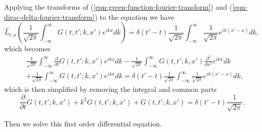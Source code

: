 \documentclass{tufte-handout}
\begin{document}
Applying the transforms of (\ref{eqn-green-function-fourier-transform}) and (\ref{eqn-dirac-delta-fourier-transform}) to the equation we have
\begin{equation}
    \hat L_{t,x}\left( \frac{1}{\sqrt{2\pi}}\int_{-\infty}^\infty G(t,t';k,x')  e^{i kx} dk \right) = \delta(t'-t) \frac{1}{\sqrt{2\pi}} \int_{-\infty}^\infty \frac{1}{\sqrt{2\pi}}  e^{i k(x'-x)} dk,
\end{equation}
which becomes
\begin{align*}
    &\frac{1}{\sqrt{2\pi}}\int_{-\infty}^\infty \frac{\partial}{\partial t}  G(t,t';k,x') e^{ikx}dk - \frac{1}{\sqrt{2\pi}}\int_{-\infty}^\infty  G(t,t';k,x') \frac{\partial^2}{\partial x^2} e^{ikx}dk  \\
    &+  \frac{1}{\sqrt{2\pi}}\int_{-\infty}^\infty G(t,t';k,x')e^{ikx}dk = \delta(t'-t) \frac{1}{\sqrt{2\pi}} \int_{-\infty}^\infty \frac{1}{\sqrt{2\pi}} e^{ik(x'-x)} dk,
\end{align*}
which is then simplified by removing the integral and common parts
\begin{equation}
    \frac{\partial}{\partial t} G(t,t';k,x')  + k^2 G(t,t';k,x') + G(t,t';k,x') = \delta(t'-t) \frac{1}{\sqrt{2\pi}} .
\end{equation}

Then we solve this first order differential equation.







\end{document}
